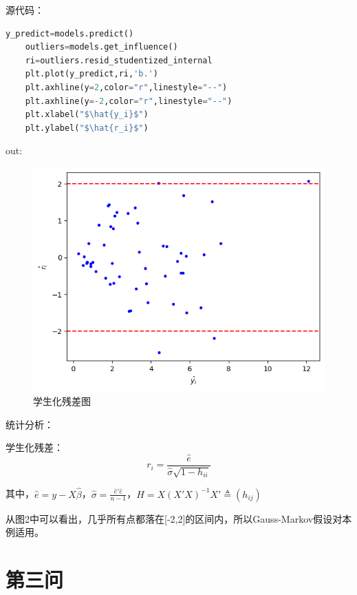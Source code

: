 \documentclass[a4paper,12pt]{article}
\begin{document}
源代码：
\begin{lstlisting}[language=python,breaklines]
	y_predict=models.predict()
	outliers=models.get_influence()
	ri=outliers.resid_studentized_internal
	plt.plot(y_predict,ri,'b.')
	plt.axhline(y=2,color="r",linestyle="--")
	plt.axhline(y=-2,color="r",linestyle="--")
	plt.xlabel("$\hat{y_i}$")
	plt.ylabel("$\hat{r_i}$")
\end{lstlisting}
out: 
\begin{figure}[htbp]
	\centering
	\includegraphics[scale=0.5]{out2.png}
	\caption{学生化残差图}
\end{figure}

统计分析：

学生化残差：$$r_i=\frac{\hat{e}}{\hat{\sigma}\sqrt{1-h_{ii}}}$$

其中，$\hat{e}=y-X\hat{\beta}$，$\hat{\sigma}=\frac{\hat{e}'\hat{e}}{n-1}$，$H=X(X'X)^{-1}X'\triangleq (h_{ij})$

从图2中可以看出，几乎所有点都落在[-2,2]的区间内，所以Gauss-Markov假设对本例适用。

\section{第三问}
\end{document}
